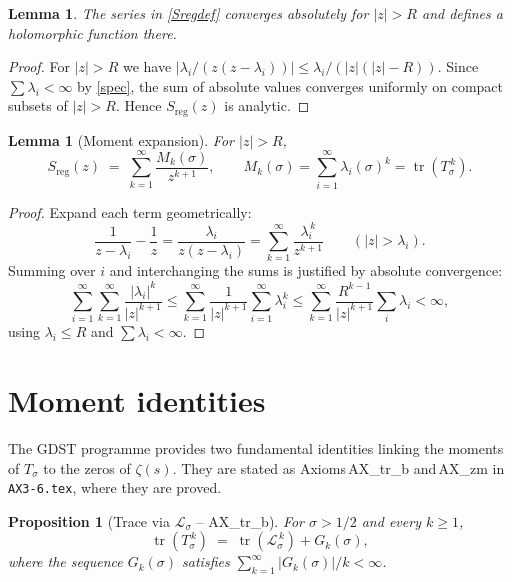 \documentclass[11pt,a4paper]{article}
\newtheorem{lemma}[theorem]{Lemma}
\newtheorem{proposition}[theorem]{Proposition}
\theoremstyle{definition}
\newcommand{\LOp}{\mathcal{L}}
\newcommand{\TOp}{T}
\newcommand{\tr}{\operatorname{tr}}
\begin{document}
\begin{lemma}\label{lem:Sconv}
The series in \eqref{Sregdef} converges absolutely for \(|z| > R\) and
defines a holomorphic function there.
\end{lemma}
\begin{proof}
For \(|z| > R\) we have \(|\lambda_i/(z(z-\lambda_i))| \le
\lambda_i/(|z|(|z|-R))\).  Since \(\sum \lambda_i < \infty\) by
\ref{spec}, the sum of absolute values converges uniformly on compact
subsets of \(|z| > R\).  Hence \(S_{\mathrm{reg}}(z)\) is analytic.
\end{proof}

\begin{lemma}[Moment expansion]\label{lem:moment}
For \(|z| > R\),
\[
S_{\mathrm{reg}}(z) \;=\; \sum_{k=1}^\infty \frac{M_k(\sigma)}{z^{k+1}},
\qquad
M_k(\sigma) = \sum_{i=1}^\infty \lambda_i(\sigma)^k = \tr(\TOp_\sigma^{\,k}).
\]
\end{lemma}
\begin{proof}
Expand each term geometrically:
\[
\frac{1}{z-\lambda_i} - \frac{1}{z}
= \frac{\lambda_i}{z(z-\lambda_i)}
= \sum_{k=1}^\infty \frac{\lambda_i^{\,k}}{z^{k+1}} \qquad (|z| > \lambda_i).
\]
Summing over \(i\) and interchanging the sums is justified by absolute
convergence:
\[
\sum_{i=1}^\infty \sum_{k=1}^\infty \frac{|\lambda_i|^k}{|z|^{k+1}}
\le \sum_{k=1}^\infty \frac{1}{|z|^{k+1}} \sum_{i=1}^\infty \lambda_i^k
\le \sum_{k=1}^\infty \frac{R^{k-1}}{|z|^{k+1}} \sum_i \lambda_i < \infty,
\]
using \(\lambda_i \le R\) and \(\sum \lambda_i < \infty\).
\end{proof}

\section{Moment identities}
The GDST programme provides two fundamental identities linking the
moments of \(\TOp_\sigma\) to the zeros of \(\zeta(s)\).  They are
stated as Axioms AX\_tr\_b and AX\_zm in \texttt{AX3‑6.tex}, where
they are proved.

\begin{proposition}[Trace via \(\LOp_\sigma\) -- AX\_tr\_b]\label{prop:tr}
For \(\sigma > 1/2\) and every \(k \ge 1\),
\begin{equation}\label{eq:tr}
\tr(\TOp_\sigma^{\,k}) \;=\; \tr(\LOp_\sigma^{\,k}) + G_k(\sigma),
\end{equation}
where the sequence \(G_k(\sigma)\) satisfies
\(\sum_{k=1}^\infty |G_k(\sigma)|/k < \infty\).
\end{proposition}
\end{document}
